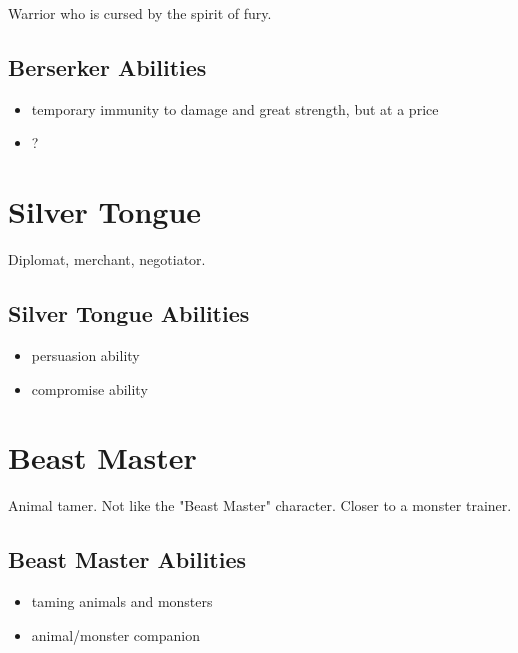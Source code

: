 \begin{multicols}{2}
Warrior who is cursed by the spirit of fury.

\subsection{Berserker Abilities}

\begin{itemize}
    \item temporary immunity to damage and great strength, but at a price
    \item ?
\end{itemize}

\section{Silver Tongue}

Diplomat, merchant, negotiator.

\subsection{Silver Tongue Abilities}

\begin{itemize}
    \item persuasion ability
    \item compromise ability
\end{itemize}

\section{Beast Master}

Animal tamer. Not like the "Beast Master" character. Closer to a monster trainer.

\subsection{Beast Master Abilities}

\begin{itemize}
    \item taming animals and monsters
    \item animal/monster companion
\end{itemize}

\end{multicols}
